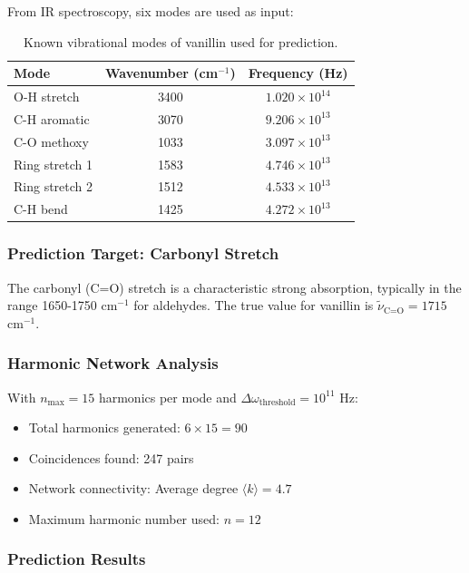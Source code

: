 From IR spectroscopy, six modes are used as input:

\begin{table}[h]
\centering
\begin{tabular}{|l|c|c|}
\hline
\textbf{Mode} & \textbf{Wavenumber (cm$^{-1}$)} & \textbf{Frequency (Hz)} \\
\hline
O-H stretch & 3400 & $1.020 \times 10^{14}$ \\
C-H aromatic & 3070 & $9.206 \times 10^{13}$ \\
C-O methoxy & 1033 & $3.097 \times 10^{13}$ \\
Ring stretch 1 & 1583 & $4.746 \times 10^{13}$ \\
Ring stretch 2 & 1512 & $4.533 \times 10^{13}$ \\
C-H bend & 1425 & $4.272 \times 10^{13}$ \\
\hline
\end{tabular}
\caption{Known vibrational modes of vanillin used for prediction.}
\end{table}

\subsubsection{Prediction Target: Carbonyl Stretch}

The carbonyl (C=O) stretch is a characteristic strong absorption, typically in the range 1650-1750 cm$^{-1}$ for aldehydes. The true value for vanillin is $\tilde{\nu}_{\text{C=O}} = 1715$ cm$^{-1}$.

\subsubsection{Harmonic Network Analysis}

With $n_{\max} = 15$ harmonics per mode and $\Delta\omega_{\text{threshold}} = 10^{11}$ Hz:

\begin{itemize}
\item Total harmonics generated: $6 \times 15 = 90$
\item Coincidences found: 247 pairs
\item Network connectivity: Average degree $\langle k \rangle = 4.7$
\item Maximum harmonic number used: $n = 12$
\end{itemize}

\subsubsection{Prediction Results}


